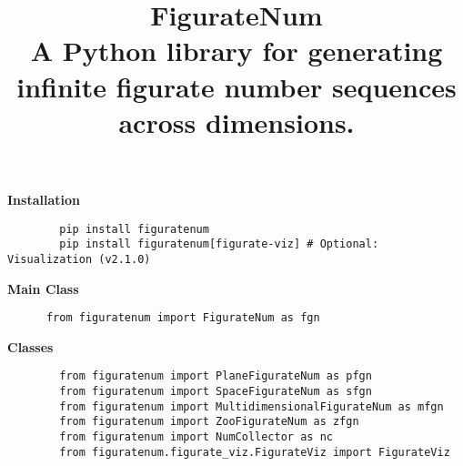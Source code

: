 \documentclass{article}
\title{\huge \textbf{FigurateNum} \\
   \Large  A Python library for generating infinite figurate number sequences across dimensions.}
\author{}
\date{}
\begin{document}
\begin{tcolorbox}[leftrule=1mm, rightrule=1mm, toprule=1mm, bottomrule=1mm ]
    \maketitle
    \vspace{-5em}
    \begin{multicols}{2}

        \begin{tcolorbox}[leftrule=2mm, rightrule=0mm, toprule=0mm, bottomrule=0mm,  colframe=SpringGreen4, colback=SpringGreen4!12, height=1.9cm]
            \textbf{\large Installation}
            \begin{lstlisting}
        pip install figuratenum
        pip install figuratenum[figurate-viz] # Optional: Visualization (v2.1.0)
            \end{lstlisting}
        \end{tcolorbox}

        \begin{tcolorbox}[leftrule=2mm, rightrule=0mm, toprule=0mm, bottomrule=0mm,  colframe=SpringGreen4, colback=SpringGreen4!12, height=1.7cm]
            \textbf{\large Main Class}
            \begin{lstlisting}
      from figuratenum import FigurateNum as fgn
             \end{lstlisting}
        \end{tcolorbox}

        \begin{tcolorbox}[leftrule=2mm, rightrule=0mm, toprule=0mm, bottomrule=0mm,  colframe=SpringGreen4, colback=SpringGreen4!12, height=3.6cm]
            \textbf{\large Classes}
            \begin{lstlisting}
        from figuratenum import PlaneFigurateNum as pfgn
        from figuratenum import SpaceFigurateNum as sfgn
        from figuratenum import MultidimensionalFigurateNum as mfgn
        from figuratenum import ZooFigurateNum as zfgn
        from figuratenum import NumCollector as nc
        from figuratenum.figurate_viz.FigurateViz import FigurateViz
             \end{lstlisting}
        \end{tcolorbox}

    \end{multicols}
\end{tcolorbox}

\thispagestyle{fancy}
\end{document}
